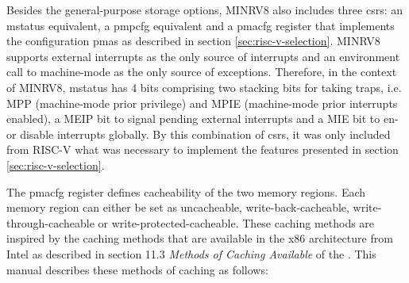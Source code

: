Besides the general-purpose storage options, MINRV8 also includes three \glspl{csr}: an \gls{mstatus} equivalent, a \gls{pmpcfg} equivalent and a \gls{pmacfg} register that implements the configuration \glspl{pma} as described in section \ref{sec:risc-v-selection}.
MINRV8 supports external interrupts as the only source of interrupts and an environment call to machine-mode as the only source of exceptions.
Therefore, in the context of MINRV8, \gls{mstatus} has 4 bits comprising two stacking bits for taking traps, i.e. MPP (machine-mode prior privilege) and MPIE (machine-mode prior interrupts enabled), a MEIP bit to signal pending external interrupts and a MIE bit to en- or disable interrupts globally.
By this combination of \glspl{csr}, it was only included from RISC-V what was necessary to implement the features presented in section \ref{sec:risc-v-selection}.

The \gls{pmacfg} register defines cacheability of the two memory regions.
Each memory region can either be set as uncacheable, write-back-cacheable, write-through-cacheable or write-protected-cacheable.
These caching methods are inspired by the caching methods that are available in the x86 architecture from Intel as described in section 11.3 \textit{Methods of Caching Available} of the  \cite{IntelSystemProgramming}.
This manual describes these methods of caching as follows:

